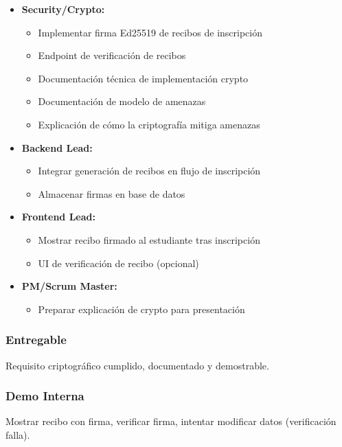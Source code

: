\documentclass[12pt,a4paper]{article}
\begin{document}
\begin{itemize}[leftmargin=*]
    \item \textbf{Security/Crypto:}
    \begin{itemize}
        \item Implementar firma Ed25519 de recibos de inscripción
        \item Endpoint de verificación de recibos
        \item Documentación técnica de implementación crypto
        \item Documentación de modelo de amenazas
        \item Explicación de cómo la criptografía mitiga amenazas
    \end{itemize}
    
    \item \textbf{Backend Lead:}
    \begin{itemize}
        \item Integrar generación de recibos en flujo de inscripción
        \item Almacenar firmas en base de datos
    \end{itemize}
    
    \item \textbf{Frontend Lead:}
    \begin{itemize}
        \item Mostrar recibo firmado al estudiante tras inscripción
        \item UI de verificación de recibo (opcional)
    \end{itemize}
    
    \item \textbf{PM/Scrum Master:}
    \begin{itemize}
        \item Preparar explicación de crypto para presentación
    \end{itemize}
\end{itemize}

\subsubsection{Entregable}
Requisito criptográfico cumplido, documentado y demostrable.

\subsubsection{Demo Interna}
Mostrar recibo con firma, verificar firma, intentar modificar datos (verificación falla).
\end{document}
